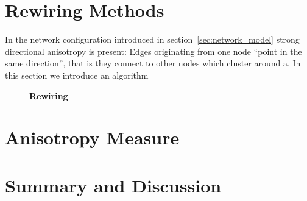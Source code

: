 \section{Rewiring Methods}

In the network configuration introduced in
section~\ref{sec:network_model} strong directional anisotropy is
present: Edges originating from one node \enquote{point in the same
  direction}, that is they connect to other nodes which cluster around
a. In this section we introduce an algorithm

\vspace{0.5cm}
\begin{figure}[h] 
  \centering 
  \caption{\textbf{Rewiring}}%
  \label{fig:distance_rewiring}
\end{figure}

 

\section{Anisotropy Measure}


\section{Summary and Discussion}













